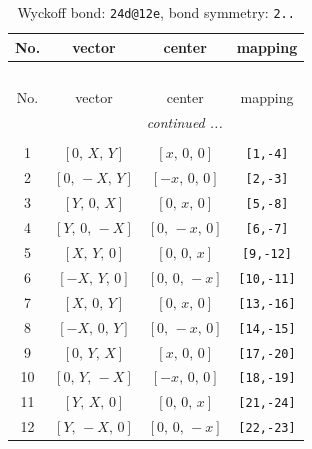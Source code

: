 \documentclass[fleqn,8pt]{jsarticle}
\begin{document}
\begin{longtable}{cccc}
\caption{Wyckoff bond: {\tt 24d@12e}, bond symmetry: {\tt 2..}}
 \\
 \hline \hline
No. & vector & center & mapping \\ \hline \endfirsthead

\multicolumn{3}{l}{\tablename\ \thetable{}} \\
 \hline \hline
No. & vector & center & mapping \\ \hline \endhead

 \hline \hline
\multicolumn{3}{r}{\footnotesize\it continued ...} \\ \endfoot

 \hline \hline
\multicolumn{3}{r}{} \\ \endlastfoot

1 & $\left[ 0,\, X,\, Y \right]$ & $\left[ x,\, 0,\, 0 \right]$ & {\tt [1,-4]} \\ \hline
2 & $\left[ 0,\, - X,\, Y \right]$ & $\left[ - x,\, 0,\, 0 \right]$ & {\tt [2,-3]} \\ \hline
3 & $\left[ Y,\, 0,\, X \right]$ & $\left[ 0,\, x,\, 0 \right]$ & {\tt [5,-8]} \\ \hline
4 & $\left[ Y,\, 0,\, - X \right]$ & $\left[ 0,\, - x,\, 0 \right]$ & {\tt [6,-7]} \\ \hline
5 & $\left[ X,\, Y,\, 0 \right]$ & $\left[ 0,\, 0,\, x \right]$ & {\tt [9,-12]} \\ \hline
6 & $\left[ - X,\, Y,\, 0 \right]$ & $\left[ 0,\, 0,\, - x \right]$ & {\tt [10,-11]} \\ \hline
7 & $\left[ X,\, 0,\, Y \right]$ & $\left[ 0,\, x,\, 0 \right]$ & {\tt [13,-16]} \\ \hline
8 & $\left[ - X,\, 0,\, Y \right]$ & $\left[ 0,\, - x,\, 0 \right]$ & {\tt [14,-15]} \\ \hline
9 & $\left[ 0,\, Y,\, X \right]$ & $\left[ x,\, 0,\, 0 \right]$ & {\tt [17,-20]} \\ \hline
10 & $\left[ 0,\, Y,\, - X \right]$ & $\left[ - x,\, 0,\, 0 \right]$ & {\tt [18,-19]} \\ \hline
11 & $\left[ Y,\, X,\, 0 \right]$ & $\left[ 0,\, 0,\, x \right]$ & {\tt [21,-24]} \\ \hline
12 & $\left[ Y,\, - X,\, 0 \right]$ & $\left[ 0,\, 0,\, - x \right]$ & {\tt [22,-23]} \\
\end{longtable}
\renewcommand{\arraystretch}{1.2}
\end{document}
